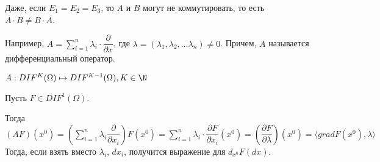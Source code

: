 \begin{note}
    Даже, если $E_1 = E_2 = E_3$, то $A$ и $B$ могут не коммутировать, то есть $A \cdot B \neq B \cdot A$.

    Например, $A = \sum_{i = 1}^n \lambda_i \cdot \dfrac{\partial }{\partial x}$, где $\lambda = (\lambda_1, \lambda_2, \dots \lambda_n) \neq 0$. Причем, $A$ называется дифференциальный оператор.

    $A: DIF^K(\Omega) \mapsto DIF^{K-1}(\Omega), K \in \N$ 
\end{note}

\begin{note}
    Пусть $F \in DIF^1(\Omega)$.

    Тогда $(AF)(x^0) = \left(\sum_{i = 1}^n \lambda_i \dfrac{\partial}{\partial x_i} \right) F(x^0) = \sum_{i = 1}^n \lambda_i \cdot \dfrac{\partial F}{\partial x_i}(x^0) = \left(\dfrac{\partial F}{\partial \lambda}\right)(x^0) = \langle grad F(x^0), \lambda \rangle$
    Тогда, если взять вместо $\lambda_i$, $dx_i$, получится выражение для $d_{x^0}F(dx)$.
\end{note}



